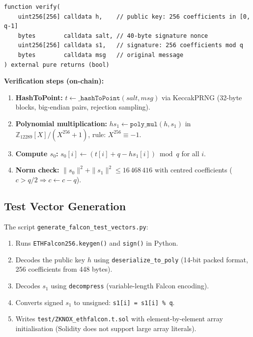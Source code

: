 \documentclass[11pt,a4paper]{article}
\begin{document}
\begin{lstlisting}[style=solidity,caption={ZKNOX\_ethfalcon.sol interface}]
function verify(
    uint256[256] calldata h,    // public key: 256 coefficients in [0, q-1]
    bytes        calldata salt, // 40-byte signature nonce
    uint256[256] calldata s1,   // signature: 256 coefficients mod q
    bytes        calldata msg   // original message
) external pure returns (bool)
\end{lstlisting}

\textbf{Verification steps (on-chain):}
\begin{enumerate}
  \item \textbf{HashToPoint:} $t \leftarrow \texttt{\_hashToPoint}(salt, msg)$
        via KeccakPRNG (32-byte blocks, big-endian pairs, rejection sampling).
  \item \textbf{Polynomial multiplication:}
        $hs_1 \leftarrow \texttt{poly\_mul}(h, s_1)$
        in $\mathbb{Z}_{12289}[X]/(X^{256}+1)$, rule: $X^{256} \equiv -1$.
  \item \textbf{Compute $s_0$:}
        $s_0[i] \leftarrow (t[i] + q - hs_1[i]) \bmod q$ for all $i$.
  \item \textbf{Norm check:}
        $\|s_0\|^2 + \|s_1\|^2 \leq 16\,468\,416$
        with centred coefficients ($c > q/2 \Rightarrow c \leftarrow c-q$).
\end{enumerate}

\subsection{Test Vector Generation}

The script \texttt{generate\_falcon\_test\_vectors.py}:
\begin{enumerate}
  \item Runs \texttt{ETHFalcon256.keygen()} and \texttt{sign()} in Python.
  \item Decodes the public key $h$ using \texttt{deserialize\_to\_poly}
        (14-bit packed format, 256 coefficients from 448 bytes).
  \item Decodes $s_1$ using \texttt{decompress} (variable-length Falcon encoding).
  \item Converts signed $s_1$ to unsigned: \texttt{s1[i] = s1[i] \% q}.
  \item Writes \texttt{test/ZKNOX\_ethfalcon.t.sol} with element-by-element
        array initialisation (Solidity does not support large array literals).
\end{enumerate}
\end{document}
